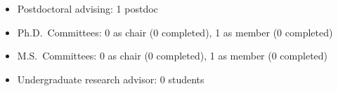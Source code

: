 \begin{itemize}
    \item Postdoctoral advising: 1 postdoc
    \item Ph.D.\ Committees: 0 as chair (0 completed), 1 as member (0 completed)
    \item M.S.\ Committees:  0 as chair (0 completed), 1 as member (0 completed)
    \item Undergraduate research advisor: 0 students
\end{itemize}
